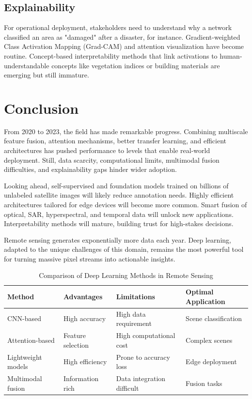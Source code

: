 \documentclass[12pt,a4paper]{article}
\begin{document}
\subsection{Explainability}
For operational deployment, stakeholders need to understand why a network classified an area as "damaged" after a disaster, for instance. Gradient-weighted Class Activation Mapping (Grad-CAM) and attention visualization have become routine. Concept-based interpretability methods that link activations to human-understandable concepts like vegetation indices or building materials are emerging but still immature.

\section{Conclusion}
\label{sec:conclusion}
From 2020 to 2023, the field has made remarkable progress. Combining multiscale feature fusion, attention mechanisms, better transfer learning, and efficient architectures has pushed performance to levels that enable real-world deployment. Still, data scarcity, computational limits, multimodal fusion difficulties, and explainability gaps hinder wider adoption.

Looking ahead, self-supervised and foundation models trained on billions of unlabeled satellite images will likely reduce annotation needs. Highly efficient architectures tailored for edge devices will become more common. Smart fusion of optical, SAR, hyperspectral, and temporal data will unlock new applications. Interpretability methods will mature, building trust for high-stakes decisions.

Remote sensing generates exponentially more data each year. Deep learning, adapted to the unique challenges of this domain, remains the most powerful tool for turning massive pixel streams into actionable insights.

\begin{table}[htbp]
\centering
\caption{Comparison of Deep Learning Methods in Remote Sensing}
\label{tab:comparison}
\begin{tabular}{@{}llll@{}}
\toprule
\textbf{Method} & \textbf{Advantages} & \textbf{Limitations} & \textbf{Optimal Application} \\
\midrule
CNN-based & High accuracy & High data requirement & Scene classification \\
Attention-based & Feature selection & High computational cost & Complex scenes \\
Lightweight models & High efficiency & Prone to accuracy loss & Edge deployment \\
Multimodal fusion & Information rich & Data integration difficult & Fusion tasks \\
\bottomrule
\end{tabular}
\end{table}
\end{document}
